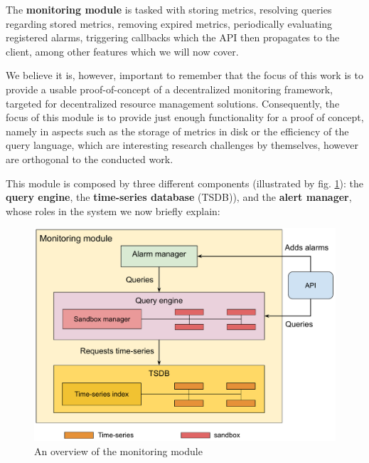 

The \textbf{monitoring module} is tasked with storing metrics, resolving queries regarding stored metrics, removing expired metrics, periodically evaluating registered alarms, triggering callbacks which the API then propagates to the client, among other features which we will now cover.

We believe it is, however, important to remember that the focus of this work is to provide a usable proof-of-concept of a decentralized monitoring framework, targeted for decentralized resource management solutions. Consequently, the focus of this module is to provide just enough functionality for a proof of concept, namely in aspects such as the storage of metrics in disk or the efficiency of the query language, which are interesting research challenges by themselves, however are orthogonal to the conducted work. 

This module is composed by three different components (illustrated by fig. \ref{fig:mon_module_overview}): the \textbf{query engine}, the \textbf{time-series database} (TSDB)), and the \textbf{alert manager}, whose roles in the system we now briefly explain:

\begin{figure}[htbp]
    \centering
    \includegraphics[width=\textwidth]{Chapters/mon_module/images/Monitoring_module.pdf}
    \caption{An overview of the monitoring module}
    \label{fig:mon_module_overview}
\end{figure}

